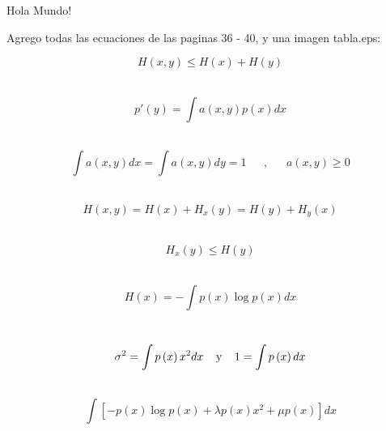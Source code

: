 Hola Mundo!

Agrego todas las ecuaciones de las paginas 36 - 40, y una imagen tabla.eps:

\begin{equation}
H\left ( x,y \right )\leq H\left ( x \right )+H\left ( y \right )
\end{equation}

\\

\begin{equation}
{p}'\left ( y \right )=\int a\left ( x,y \right )p\left ( x \right )dx
\end{equation}

\\

\begin{equation}
\int a\left ( x,y \right )dx=\int a\left ( x,y \right )dy=1
\:\:\:\:\:\:\:,\:\:\:\:\:\:\:
a\left ( x,y \right )\geq 0
\end{equation}

\\

\begin{equation}
H\left ( x,y \right )=H\left ( x \right )+H_{x}\left ( y \right )=H\left ( y \right )+H_{y}\left ( x \right )
\end{equation}

\\

\begin{equation}
H_x{}\left ( y \right )\leq H\left ( y \right )
\end{equation}

\\

\begin{equation}
H\left ( x \right )=-\int p\left ( x \right )\log p\left ( x \right )dx
\end{equation}

\\

\begin{equation}
\sigma^{2}=\int p\left ( x \right )x^{2}dx \:\:\:\:\: \textup{y} \:\:\:\:\: 1=\int p\left ( x \right )dx
\end{equation}

\\

\begin{equation}
\int \left [ -p\left ( x \right ) \log p\left ( x \right ) + \lambda p\left ( x \right ) x^{2} + \mu p\left ( x \right )\right ]dx
\end{equation}

